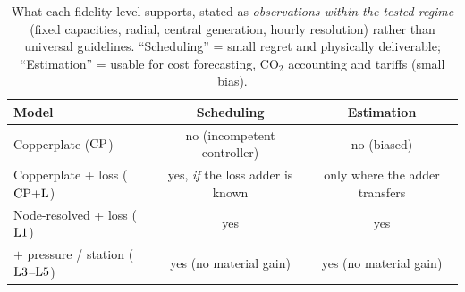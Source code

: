 \begin{table}[t]
\centering
\caption{What each fidelity level supports, stated as \emph{observations within the tested
regime} (fixed capacities, radial, central generation, hourly resolution) rather than universal
guidelines. ``Scheduling'' = small regret and physically deliverable; ``Estimation'' = usable for
cost forecasting, CO$_2$ accounting and tariffs (small bias).}
\label{tab:criteria}
\begin{tabular}{lcc}
\hline
Model & Scheduling & Estimation \\
\hline
Copperplate ($\mathrm{CP}$) & no (incompetent controller) & no (biased) \\
Copperplate + loss ($\mathrm{CP{+}L}$) & yes, \emph{if} the loss adder is known & only where the adder transfers \\
Node-resolved + loss ($\mathrm{L1}$) & yes & yes \\
$+$ pressure / station ($\mathrm{L3}$--$\mathrm{L5}$) & yes (no material gain) & yes (no material gain) \\
\hline
\end{tabular}
\end{table}
